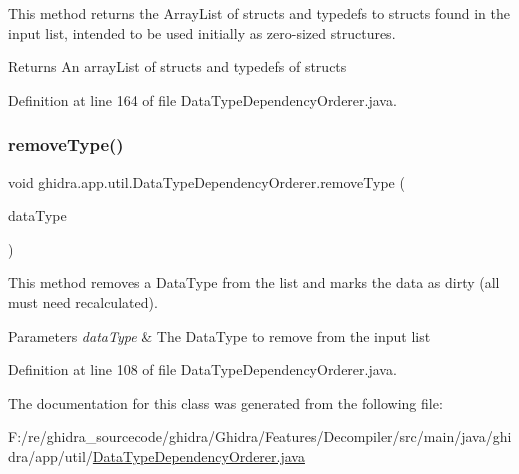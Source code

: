 This method returns the Array\+List of structs and typedefs to structs found in the input list, intended to be used initially as zero-\/sized structures. \begin{DoxyReturn}{Returns}
An array\+List of structs and typedefs of structs 
\end{DoxyReturn}


Definition at line 164 of file Data\+Type\+Dependency\+Orderer.\+java.

\mbox{\label{classghidra_1_1app_1_1util_1_1_data_type_dependency_orderer_a2bb52e75deb4e3b235cbe160374c5764}} 
\subsubsection{\texorpdfstring{removeType()}{removeType()}}
{\footnotesize\ttfamily void ghidra.\+app.\+util.\+Data\+Type\+Dependency\+Orderer.\+remove\+Type (\begin{DoxyParamCaption}\item[{Data\+Type}]{data\+Type }\end{DoxyParamCaption})\hspace{0.3cm}{\ttfamily [inline]}}

This method removes a Data\+Type from the list and marks the data as dirty (all must need recalculated). 
\begin{DoxyParams}{Parameters}
{\em data\+Type} & The Data\+Type to remove from the input list \\
\hline
\end{DoxyParams}


Definition at line 108 of file Data\+Type\+Dependency\+Orderer.\+java.



The documentation for this class was generated from the following file\+:\begin{DoxyCompactItemize}
\item 
F\+:/re/ghidra\+\_\+sourcecode/ghidra/\+Ghidra/\+Features/\+Decompiler/src/main/java/ghidra/app/util/\mbox{\hyperlink{_data_type_dependency_orderer_8java}{Data\+Type\+Dependency\+Orderer.\+java}}\end{DoxyCompactItemize}
